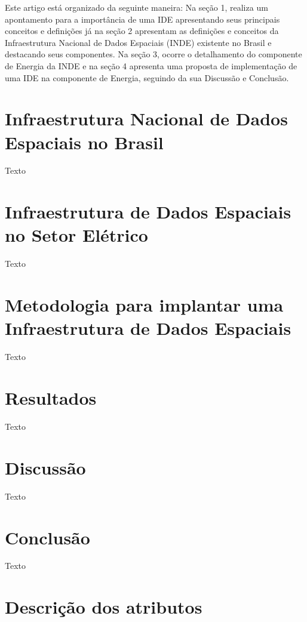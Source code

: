 \documentclass[final,authoryear,5p,times,twocolumn, 12pt]{elsarticle}
\begin{document}
Este artigo está organizado da seguinte maneira: Na seção 1, realiza um apontamento para a importância de uma IDE apresentando seus principais conceitos e definições já na seção 2 apresentam as definições e conceitos da Infraestrutura Nacional de Dados Espaciais (INDE) existente no Brasil e destacando seus componentes. Na seção 3, ocorre o detalhamento do componente de Energia da INDE e na seção 4 apresenta uma proposta de implementação de uma IDE na componente de Energia, seguindo da sua Discussão e Conclusão.
\citep{E}

\section{Infraestrutura Nacional de Dados Espaciais no Brasil}
\label{sec2}
Texto

\section{Infraestrutura de Dados Espaciais no Setor El\'etrico}
\label{sec3}
Texto

\section{Metodologia para implantar uma Infraestrutura de Dados Espaciais}
\label{sec4}
Texto

\section{Resultados}
\label{sec5}
Texto

\section{Discuss\~ao}
\label{sec6}
Texto

\section{Conclus\~ao}
\label{sec7}
Texto

\appendix
\section{Descri\c{c}\~ao dos atributos}
\label{appendix}


\end{document}
